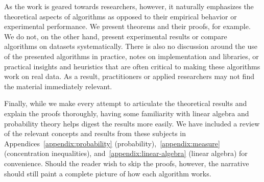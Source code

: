 As the work is geared towards researchers, however, it naturally emphasizes the theoretical
aspects of algorithms as opposed to their empirical behavior or experimental
performance. We present theorems and their proofs, for example.
We do not, on the other hand, present experimental results or compare
algorithms on datasets systematically. There is also no discussion around the
use of the presented algorithms in practice, notes on implementation and libraries, or
practical insights and heuristics that are often critical to making these algorithms
work on real data.
As a result, practitioners or applied researchers may not find
the material immediately relevant.

Finally, while we make every attempt to articulate the theoretical results
and explain the proofs thoroughly, having some familiarity with linear algebra
and probability theory helps digest the results more easily.
We have included a review of the relevant concepts and results from
these subjects in Appendices~\ref{appendix:probability}
(probability),~\ref{appendix:measure} (concentration inequalities),
and~\ref{appendix:linear-algebra} (linear algebra) for convenience.
Should the reader wish to skip the proofs, however, the narrative
should still paint a complete picture of how each algorithm works.
